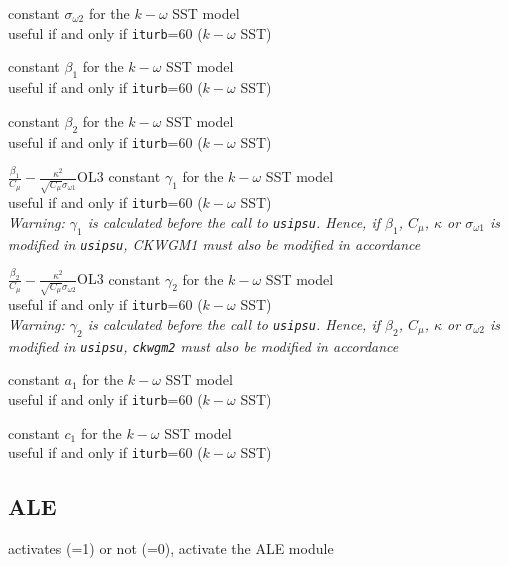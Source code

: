 {constant $\sigma_{\omega 2}$ for the $k-\omega$ SST model\\
useful if and only if {\tt iturb}=60
($k-\omega$ SST)}

{constant $\beta_1$ for the $k-\omega$ SST model\\
useful if and only if {\tt iturb}=60
($k-\omega$ SST)}

{constant $\beta_2$ for the $k-\omega$ SST model\\
useful if and only if {\tt iturb}=60
($k-\omega$ SST)}

{$\frac{\beta_1}{C_\mu}-\frac{\kappa^2}{\sqrt{C_\mu}\sigma_{\omega 1}}$}{O}{L3}
{constant $\gamma_1$ for the $k-\omega$ SST model\\
useful if and only if {\tt iturb}=60
($k-\omega$ SST)\\
{\em Warning: $\gamma_1$ is calculated before the call to
\texttt{usipsu}. Hence, if $\beta_1$, $C_\mu$, $\kappa$ or $\sigma_{\omega 1}$
is modified in \texttt{usipsu}, CKWGM1 must also be modified in accordance}}

{$\frac{\beta_2}{C_\mu}-\frac{\kappa^2}{\sqrt{C_\mu}\sigma_{\omega 2}}$}{O}{L3}
{constant $\gamma_2$ for the $k-\omega$ SST model\\
useful if and only if {\tt iturb}=60
($k-\omega$ SST)\\
{\em Warning: $\gamma_2$ is calculated before the call to
\texttt{usipsu}. Hence, if $\beta_2$, $C_\mu$, $\kappa$ or $\sigma_{\omega 2}$
is modified in \texttt{usipsu}, \texttt{ckwgm2} must also be modified in
accordance}}

{constant $a_1$ for the $k-\omega$ SST model\\
useful if and only if {\tt iturb}=60
($k-\omega$ SST)}

{constant $c_1$ for the $k-\omega$ SST model\\
useful if and only if {\tt iturb}=60
($k-\omega$ SST)}


\subsection{ALE}
{activates (=1) or not (=0), activate the ALE module}

